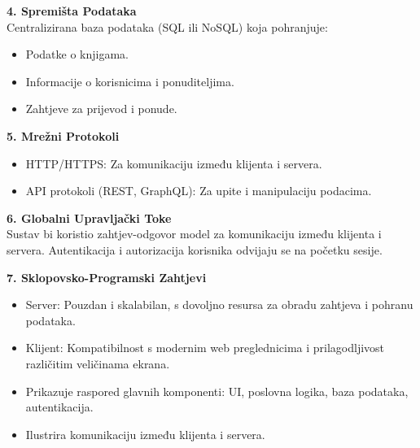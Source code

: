     \textbf{4. Spremišta Podataka}\\

        Centralizirana baza podataka (SQL ili NoSQL) koja pohranjuje:
        \begin{itemize}
		  \item {Podatke o knjigama.}
		  \item {Informacije o korisnicima i ponuditeljima.}
		  \item {Zahtjeve za prijevod i ponude.}				
	   \end{itemize}

    \textbf{5. Mrežni Protokoli}\\
    
    \begin{itemize}
		  \item {HTTP/HTTPS: Za komunikaciju između klijenta i servera.}
		  \item {API protokoli (REST, GraphQL): Za upite i manipulaciju podacima.}
	   \end{itemize}

    \textbf{6. Globalni Upravljački Toke}\\

        Sustav bi koristio zahtjev-odgovor model za komunikaciju između klijenta i servera. Autentikacija i autorizacija korisnika odvijaju se na početku sesije.
    
    \textbf{7. Sklopovsko-Programski Zahtjevi}\\

    \begin{itemize}
		  \item {Server: Pouzdan i skalabilan, s dovoljno resursa za obradu zahtjeva i pohranu podataka.}
		  \item {Klijent: Kompatibilnost s modernim web preglednicima i prilagodljivost različitim veličinama ekrana.}			
	   \end{itemize}
	   
	   
	   \begin{itemize}
	   	\item {Prikazuje raspored glavnih komponenti: UI, poslovna logika, baza podataka, autentikacija.}
	   	\item {Ilustrira komunikaciju između klijenta i servera.}			
	   \end{itemize}
	   
		
		\eject
		
